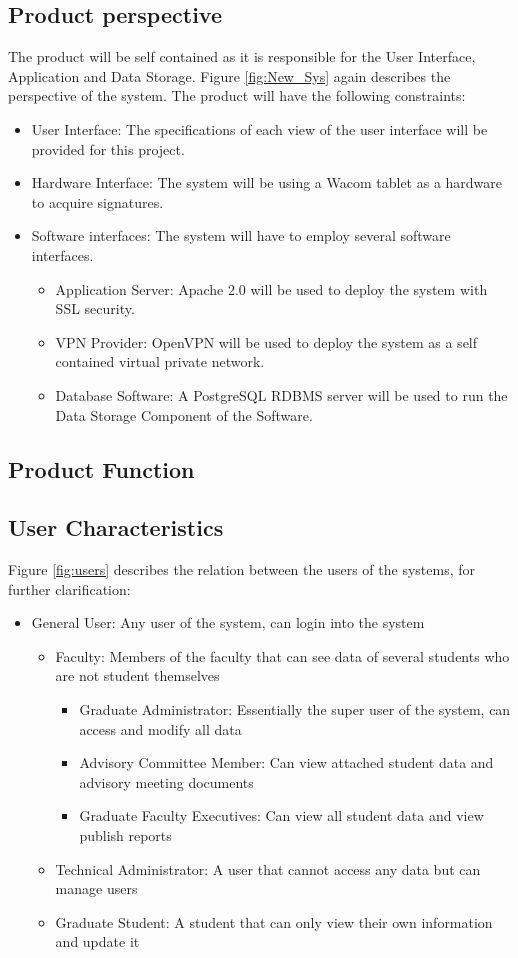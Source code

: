 \documentclass{journal}
\begin{document}
\subsection{Product perspective}
The product will be self contained as it is responsible for the User Interface, Application and Data Storage.
Figure \ref{fig:New_Sys} again describes the perspective of the system.
The product will have the following constraints:
\begin{itemize}
\item User Interface: The specifications of each view of the user interface will be provided for this project.
\item Hardware Interface: The system will be using a Wacom tablet as a hardware to acquire signatures.
\item Software interfaces: The system will have to employ several software interfaces.
\begin{itemize}
\item Application Server: Apache 2.0 will be used to deploy the system with SSL security.
\item VPN Provider: OpenVPN will be used to deploy the system as a self contained virtual private
network.
\item Database Software: A PostgreSQL RDBMS server will be used to run the Data Storage Component of the Software.
\end{itemize}
\end{itemize}
\subsection{Product Function}
\subsection{User Characteristics}
Figure \ref{fig:users} describes the relation between the users of the systems, for further clarification:
\begin{itemize}
\item General User: Any user of the system, can login into the system 
\begin{itemize}
\item Faculty: Members of the faculty that can see data of several students who are not student themselves
\begin{itemize}
\item Graduate Administrator: Essentially the super user of the system, can access and modify all data 
\item Advisory Committee Member: Can view attached student data and advisory meeting documents
\item Graduate Faculty Executives: Can view all student data and view publish reports 	
\end{itemize}
\item Technical Administrator: A user that cannot access any data but can manage users 
\item Graduate Student: A student that can only view their own information and update it
\end{itemize}
\end{itemize}
\end{document}
